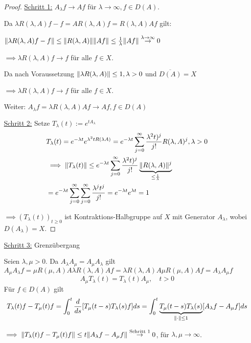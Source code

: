 \begin{proof}
\underline{Schritt 1:} $A_\lambda f \to A f$ für $\lambda \to \infty, f \in D(A)$.

Da $\lambda R(\lambda, A) f - f = AR(\lambda, A) f = R(\lambda, A) Af$ gilt:

$\lVert \lambda R(\lambda, A) f - f \rVert \leq \lVert R(\lambda, A) \rVert \lVert Af  \rVert \leq \frac{1}{\lambda} \lVert Af \rVert \overset{\lambda \to \infty}{\to} 0$

$\implies \lambda R(\lambda, A) f \to f$ für alle $f \in X$.

Da nach Voraussetzung $\lVert \lambda R(\lambda, A) \rVert \leq 1, \lambda > 0$ und $\overline{D(A)} = X$

$\implies \lambda R(\lambda, A) f \to f$ für alle $f \in X$.

Weiter: $A_\lambda f = \lambda R(\lambda, A) A f \to A f, f \in D(A)$

\underline{Schritt 2:} Setze $T_\lambda(t) := e^{tA_\lambda}$
\begin{align*}
& T_\lambda(t) = e^{-\lambda t} e^{\lambda^2 t R(\lambda A)}
= e^{-\lambda t} \sum_{j = 0}^\infty \frac{\lambda^2 t)^j}{j!} R(\lambda, A)^j, \lambda > 0 \\
&\implies \lVert T_\lambda(t) \rVert \leq e^{-\lambda t } \sum_{j = 0}^\infty \frac{\lambda^2 t)^j}{j!} \underbrace{\lVert R(\lambda, A) \rVert^j}_{\leq \frac{1}{\lambda}} \\
&= e^{-\lambda t} \sum_{j = 0}^\infty \sum_{j = 0}^\infty \frac{\lambda^j t^j}{j!} = e^{-\lambda t} e^{\lambda t} = 1
\end{align*}

$\implies (T_\lambda(t))_{t \geq 0}$ ist Kontraktions-Halbgruppe auf $X$ mit Generator $A_\lambda$, wobei $D(A_\lambda) = X$.
\end{proof}

\underline{Schritt 3:} Grenzübergang

Seien $\lambda, \mu > 0$.
Da $A_\lambda A_\mu = A_\mu A_\lambda$ gilt
{\tiny{$A_\mu A_\lambda f  =  \mu R(\mu, A) A \lambda R(\lambda, A) A f = \lambda R(\lambda, A) A \mu R(\mu, A) A  f = A_\lambda A_\mu f$}}
$$
A_\mu T_\lambda(t) = T_\lambda(t) A_\mu, \quad t >0
$$
Für $f \in D(A)$ gilt
$$
T_\lambda(t) f - T_\mu(t) f = \int_0^t \frac{d}{ds} [T_\mu(t - s) T_\lambda(s) f ] ds = \int_0^t \underbrace{T_\mu(t - s) T_\lambda(s)}_{\lVert \cdot \rVert \leq 1} [A_\lambda f - A_\mu f] ds
$$

$\implies \lVert T_\lambda(t) f - T_\mu(t) f  \rVert \leq t \lVert A_\lambda f - A_\mu f  \rVert \overset{\text{Schritt 1}}{\to} 0$, für $\lambda, \mu \to \infty$.

